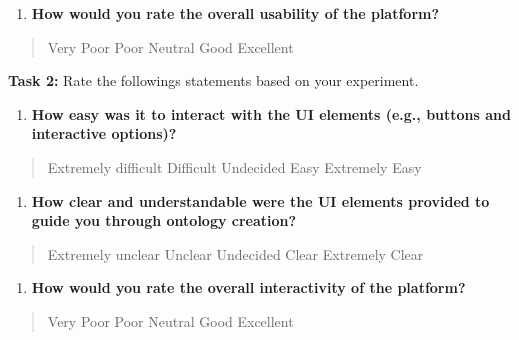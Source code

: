 \begin{appendix}
\begin{enumerate}
\def\labelenumi{\arabic{enumi}.}
\setcounter{enumi}{3}
\item
  \textbf{How would you rate the overall usability of the platform?}
\end{enumerate}

\begin{quote}
\textsquare Very Poor \textsquare  Poor \textsquare  Neutral \textsquare  Good \textsquare Excellent
\end{quote}

\newpage
\textbf{Task 2:} Rate the followings statements based on your
experiment.

\begin{enumerate}
\def\labelenumi{\arabic{enumi}.}
\item
  \textbf{How easy was it to interact with the UI elements (e.g.,
  buttons and interactive options)?}
\end{enumerate}

\begin{quote}
\textsquare  Extremely difficult \textsquare  Difficult \textsquare  Undecided \textsquare  Easy \textsquare  Extremely Easy
\end{quote}

\begin{enumerate}
\def\labelenumi{\arabic{enumi}.}
\setcounter{enumi}{1}
\item
  \textbf{How clear and understandable were the UI elements provided to
  guide you through ontology creation?}
\end{enumerate}

\begin{quote}
\textsquare  Extremely unclear \textsquare  Unclear \textsquare  Undecided \textsquare  Clear \textsquare  Extremely Clear
\end{quote}

\begin{enumerate}
\def\labelenumi{\arabic{enumi}.}
\setcounter{enumi}{2}
\item
  \textbf{How would you rate the overall interactivity of the platform?}
\end{enumerate}

\begin{quote}
\textsquare  Very Poor \textsquare  Poor \textsquare  Neutral \textsquare  Good \textsquare  Excellent
\end{quote}


\end{appendix}